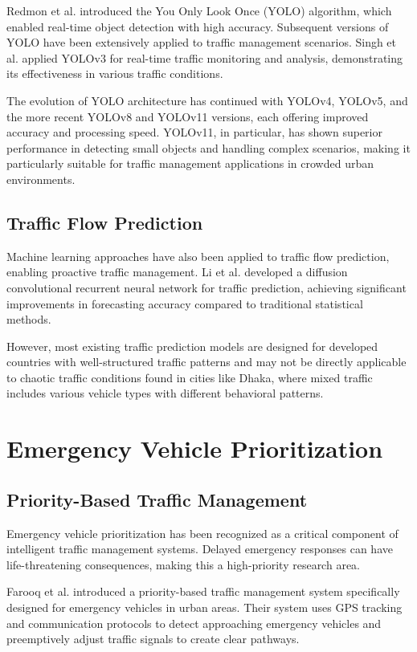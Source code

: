 Redmon et al. \cite{redmon2016yolo} introduced the You Only Look Once (YOLO) algorithm, which enabled real-time object detection with high accuracy. Subsequent versions of YOLO have been extensively applied to traffic management scenarios. Singh et al. \cite{singh2021realtime} applied YOLOv3 for real-time traffic monitoring and analysis, demonstrating its effectiveness in various traffic conditions.

The evolution of YOLO architecture has continued with YOLOv4, YOLOv5, and the more recent YOLOv8 and YOLOv11 versions, each offering improved accuracy and processing speed. YOLOv11, in particular, has shown superior performance in detecting small objects and handling complex scenarios, making it particularly suitable for traffic management applications in crowded urban environments.

\subsection{Traffic Flow Prediction}

Machine learning approaches have also been applied to traffic flow prediction, enabling proactive traffic management. Li et al. \cite{li2017diffusion} developed a diffusion convolutional recurrent neural network for traffic prediction, achieving significant improvements in forecasting accuracy compared to traditional statistical methods.

However, most existing traffic prediction models are designed for developed countries with well-structured traffic patterns and may not be directly applicable to chaotic traffic conditions found in cities like Dhaka, where mixed traffic includes various vehicle types with different behavioral patterns.

\section{Emergency Vehicle Prioritization}

\subsection{Priority-Based Traffic Management}

Emergency vehicle prioritization has been recognized as a critical component of intelligent traffic management systems. Delayed emergency responses can have life-threatening consequences, making this a high-priority research area.

Farooq et al. \cite{farooq2020priority} introduced a priority-based traffic management system specifically designed for emergency vehicles in urban areas. Their system uses GPS tracking and communication protocols to detect approaching emergency vehicles and preemptively adjust traffic signals to create clear pathways.

